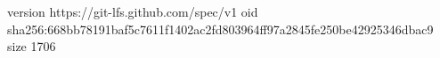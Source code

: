 version https://git-lfs.github.com/spec/v1
oid sha256:668bb78191baf5c7611f1402ac2fd803964ff97a2845fe250be42925346dbac9
size 1706
